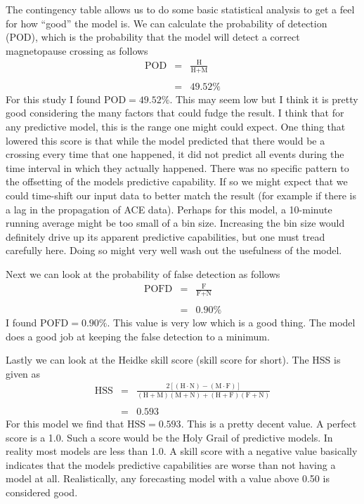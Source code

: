 \documentclass[12pt, letterpaper]{article}
\begin{document}
The contingency table allows us to do some basic statistical analysis to get a feel for how \enquote{good} the model is. We can calculate the probability of detection (POD), which is the probability that the model will detect a correct magnetopause crossing as follows
\begin{eqnarray}
\text{POD} & = & \frac{\text{H}}{\text{H} + \text{M}} \nonumber \\
& & \nonumber \\
& = & 49.52 \%
\end{eqnarray}
For this study I found $\text{POD} = 49.52\%$. This may seem low but I think it is pretty good considering the many factors that could fudge the result. I think that for any predictive model, this is the range one might could expect. One thing that lowered this score is that while the model predicted that there would be a crossing every time that one happened, it did not predict all events during the time interval in which they actually happened. There was no specific pattern to the offsetting of the models predictive capability. If so we might expect that we could time-shift our input data to better match the result (for example if there is a lag in the propagation of ACE data). Perhaps for this model, a 10-minute running average might be too small of a bin size. Increasing the bin size would definitely drive up its apparent predictive capabilities, but one must tread carefully here. Doing so might very well wash out the usefulness of the model. 

Next we can look at the probability of false detection as follows
\begin{eqnarray}
\text{POFD} & = & \frac{\text{F}}{\text{F} + \text{N}} \nonumber \\
& & \nonumber \\
& = & 0.90 \%
\end{eqnarray}
I found $\text{POFD} = 0.90\%$. This value is very low which is a good thing. The model does a good job at keeping the false detection to a minimum.

Lastly we can look at the Heidke skill score (skill score for short). The HSS is given as
\begin{eqnarray}
\text{HSS} & = & \frac{2 \left[ \left( \text{H} \cdot \text{N} \right) - \left( \text{M} \cdot \text{F} \right) \right]}{\left( \text{H} + \text{M} \right) \left( \text{M} + \text{N} \right) + \left( \text{H} + \text{F} \right) \left( \text{F} + \text{N} \right)} \nonumber \\
& & \nonumber \\
& = & 0.593
\end{eqnarray}
For this model we find that $\text{HSS} = 0.593$. This is a pretty decent value. A perfect score is a 1.0. Such a score would be the Holy Grail of predictive models. In reality most models are less than 1.0. A skill score with a negative value basically indicates that the models predictive capabilities are worse than not having a model at all. Realistically, any forecasting model with a value above 0.50 is considered good.
\end{document}
